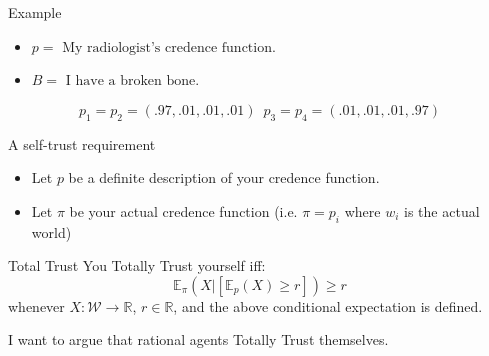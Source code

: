 \documentclass[aspectratio=169, dvipsnames]{beamer}
\newcommand{\R}{\mathbb{R}}
\newcommand{\E}{\mathbb{E}}
\newcommand{\W}{\mathcal{W}}
\begin{document}
\begin{frame}{Example}
  \begin{itemize}
  \item $p = \text{ My radiologist's credence function}$.
  \item $B = \text{ I have a broken bone}$.  
  \end{itemize}
  \begin{figure}
    \centering
  \end{figure}
  \begin{equation*}
    p_1 = p_2 = (.97, .01, .01, .01) \,\,\, p_3 = p_4 = (.01, .01, .01, .97) 
  \end{equation*}
\end{frame}

\begin{frame}{A self-trust requirement}
  \begin{itemize}
  \item Let $p$ be a definite description of your credence function.
  \item Let $\pi$ be your actual credence function (i.e. $\pi=p_i$ where $w_i$ is the actual world)
  \end{itemize}
  \begin{block}{Total Trust}
    You Totally Trust yourself iff:
    \begin{equation}
      \label{totTrust}
      \E_{\pi}(X | [\E_p(X) \geq r]) \geq r
    \end{equation}
    whenever $X: \W \to \R$, $r \in \R$, and the above conditional expectation is defined.
  \end{block}
  I want to argue that rational agents Totally Trust themselves.
\end{frame}
\end{document}
